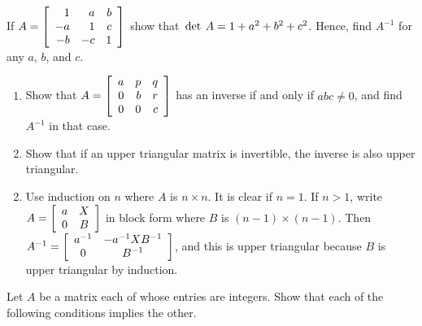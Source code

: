 \begin{multicols}{2}
\begin{ex}
\begin{sol}
\begin{enumerate}[label={\alph*.}]
\end{enumerate}
\end{sol}
\end{ex}

\begin{ex}
If $A = \left[ \begin{array}{rrr}
1 & a & b \\
-a & 1 & c \\
-b & -c & 1 
\end{array} \right]$
 show that $\thinspace\operatorname{det \medspace}A = 1 + a^{2} + b^{2} + c^{2}$. Hence, find $A^{-1}$ for any $a$, $b$, and $c$.
\end{ex}

\begin{ex}
\begin{enumerate}[label={\alph*.}]
\item Show that $A = \left[ \begin{array}{rrr}
a & p & q \\
0 & b & r \\
0 & 0 & c 
\end{array} \right]$
 has an inverse if and only if $abc \neq 0$, and find $A^{-1}$ in that case.

\item Show that if an upper triangular matrix is invertible, the inverse is also upper triangular.

\end{enumerate}
\begin{sol}
\begin{enumerate}[label={\alph*.}]
\setcounter{enumi}{1}
\item  Use induction on $n$ where $A$ is $n \times n$. It is clear if $n = 1$. If $n > 1$, write $A = \left[ \begin{array}{cc}
a & X \\
0 & B
\end{array}\right]$
 in block form where $B$ is $(n - 1) \times (n - 1)$. Then $A^{-1} = \left[ \begin{array}{cc}
a^{-1} & -a^{-1}XB^{-1} \\
0 & B^{-1}
\end{array}\right]$, and this is upper triangular because $B$ is upper triangular by induction.

\end{enumerate}
\end{sol}
\end{ex}

\begin{ex}
Let $A$ be a matrix each of whose entries are integers. Show that each of the following conditions implies the other.



\end{ex}
\end{multicols}
